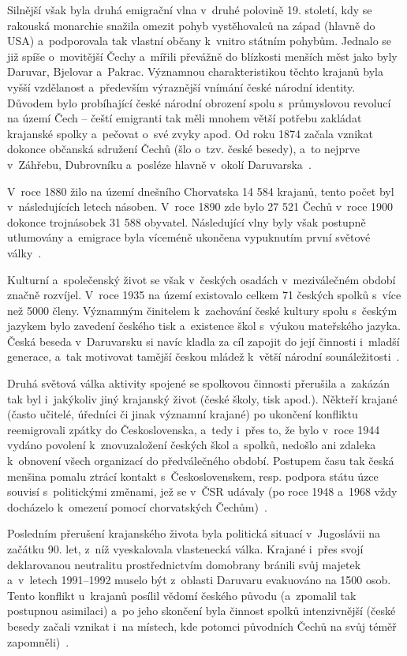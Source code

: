 Silnější však byla druhá emigrační vlna v~druhé polovině 19. století, kdy se rakouská monarchie snažila omezit pohyb vystěhovalců na západ (hlavně do USA) a~podporovala tak vlastní občany k~vnitro státním pohybům. Jednalo se již spíše o~movitější Čechy a~mířili převážně do blízkosti menších měst jako byly Daruvar, Bjelovar a~Pakrac. Významnou charakteristikou těchto krajanů byla vyšší vzdělanost a~především výraznější vnímání české národní identity. Důvodem bylo probíhající české národní obrození spolu s~průmyslovou revolucí na území Čech -- čeští emigranti tak měli mnohem větší potřebu zakládat krajanské spolky a~pečovat o~své zvyky apod. Od roku 1874 začala vznikat dokonce občanská sdružení Čechů (šlo o~tzv. české besedy), a~to nejprve v~Záhřebu, Dubrovníku a~posléze hlavně v~okolí Daruvarska~\parencite{Stranjik2017}.

V~roce 1880 žilo na území dnešního Chorvatska 14 584 krajanů, tento počet byl v~následujících letech násoben. V~roce 1890 zde bylo 27 521 Čechů v~roce 1900 dokonce trojnásobek 31 588 obyvatel. Následující vlny byly však postupně utlumovány a~emigrace byla víceméně ukončena vypuknutím první světové války~\parencite{Stranjik2017}.

Kulturní a~společenský život se však v~českých osadách v~meziválečném období značně rozvíjel. V~roce 1935 na území existovalo celkem 71 českých spolků s~více než 5000 členy. Významným činitelem k~zachování české kultury spolu s~českým jazykem bylo zavedení českého tisk a~existence škol s~výukou mateřského jazyka. Česká beseda v~Daruvarsku si navíc kladla za cíl zapojit do její činnosti i~mladší generace, a~tak motivovat tamější českou mládež k~větší národní sounáležitosti~\parencite{Preissova2020}.

Druhá světová válka aktivity spojené se spolkovou činnosti přerušila a~zakázán tak byl i~jakýkoliv jiný krajanský život (české školy, tisk apod.). Někteří krajané (často učitelé, úředníci či jinak významní krajané) po ukončení konfliktu reemigrovali zpátky do Československa, a~tedy i~přes to, že bylo v~roce 1944 vydáno povolení k~znovuzaložení českých škol a~spolků, nedošlo ani zdaleka k~obnovení všech organizací do předválečného období. Postupem času tak česká menšina pomalu ztrácí kontakt s~Československem, resp. podpora státu úzce souvisí s~politickými změnami, jež se v~ČSR udávaly (po roce 1948 a~1968 vždy docházelo k~omezení pomocí chorvatských Čechům)~\parencite{Preissova2020}.

Posledním přerušení krajanského života byla politická situací v~Jugoslávii na začátku 90. let, z~níž vyeskalovala vlastenecká válka. Krajané i~přes svojí deklarovanou neutralitu prostřednictvím domobrany bránili svůj majetek a~v~letech 1991--1992 muselo být z~oblasti Daruvaru evakuováno na 1500 osob. Tento konflikt u~krajanů posílil vědomí českého původu (a~zpomalil tak postupnou asimilaci) a~po jeho skončení byla činnost spolků intenzivnější (české besedy začali vznikat i~na místech, kde potomci původních Čechů na svůj téměř zapomněli)~\parencite{Stranjik2017}.

